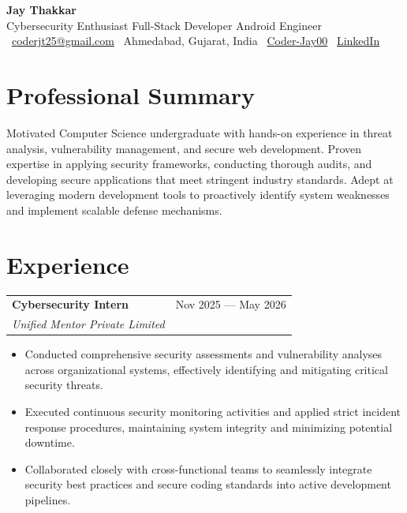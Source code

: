 \documentclass[a4paper,11pt]{article}
\makeatletter
\newcommand{\resumeEntry}[4]{
  \noindent
  \begin{tabularx}{\textwidth}{@{}X r@{}}
    \textbf{#1} & \textcolor{subtext}{\small #2} \\
    \textit{\textcolor{subtext}{#3}} & \\
  \end{tabularx}
  \begin{itemize}[leftmargin=16pt, itemsep=2pt, topsep=2pt, parsep=0pt, label={\textcolor{accent}{\small\textbullet}}]
    #4
  \end{itemize}
  \vspace{4pt}
}
\makeatother
\begin{document}
\begin{center}
  {\Huge\bfseries\textcolor{darktext}{Jay Thakkar}} \\[6pt]
  {\large\textcolor{subtext}{Cybersecurity Enthusiast \textbar{} Full-Stack Developer \textbar{} Android Engineer}} \\[10pt]
  {\small
    ~\href{mailto:coderjt25@gmail.com}{coderjt25@gmail.com} \quad
    ~Ahmedabad, Gujarat, India \quad
    ~\href{https://github.com/Coder-Jay00}{Coder-Jay00} \quad
    ~\href{https://www.linkedin.com/in/jay-thakkar-29954a274/}{LinkedIn}
  }
\end{center}

\vspace{4pt}

\section{Professional Summary}
\small
Motivated Computer Science undergraduate with hands-on experience in threat analysis, vulnerability management, and secure web development. Proven expertise in applying security frameworks, conducting thorough audits, and developing secure applications that meet stringent industry standards. Adept at leveraging modern development tools to proactively identify system weaknesses and implement scalable defense mechanisms.

\vspace{2pt}

\section{Experience}

\resumeEntry
  {Cybersecurity Intern}
  {Nov 2025 — May 2026}
  {Unified Mentor Private Limited}
  {
    \item Conducted comprehensive security assessments and vulnerability analyses across organizational systems, effectively identifying and mitigating critical security threats.
    \item Executed continuous security monitoring activities and applied strict incident response procedures, maintaining system integrity and minimizing potential downtime.
    \item Collaborated closely with cross-functional teams to seamlessly integrate security best practices and secure coding standards into active development pipelines.
  }
\end{document}
